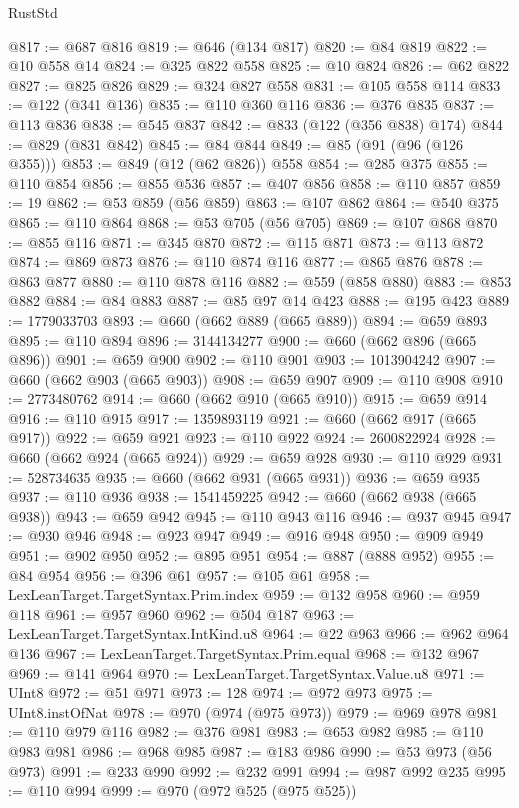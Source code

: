 \begin{lexlean}{RustStd}
\begin{coremodule}
@817 := @687 @816
@819 := @646 (@134 @817)
@820 := @84 @819
@822 := @10 @558 @14
@824 := @325 @822 @558
@825 := @10 @824
@826 := @62 @822
@827 := @825 @826
@829 := @324 @827 @558
@831 := @105 @558 @114
@833 := @122 (@341 @136)
@835 := @110 @360 @116
@836 := @376 @835
@837 := @113 @836
@838 := @545 @837
@842 := @833 (@122 (@356 @838) @174)
@844 := @829 (@831 @842)
@845 := @84 @844
@849 := @85 (@91 (@96 (@126 @355)))
@853 := @849 (@12 (@62 @826)) @558
@854 := @285 @375
@855 := @110 @854
@856 := @855 @536
@857 := @407 @856
@858 := @110 @857
@859 := 19
@862 := @53 @859 (@56 @859)
@863 := @107 @862
@864 := @540 @375
@865 := @110 @864
@868 := @53 @705 (@56 @705)
@869 := @107 @868
@870 := @855 @116
@871 := @345 @870
@872 := @115 @871
@873 := @113 @872
@874 := @869 @873
@876 := @110 @874 @116
@877 := @865 @876
@878 := @863 @877
@880 := @110 @878 @116
@882 := @559 (@858 @880)
@883 := @853 @882
@884 := @84 @883
@887 := @85 @97 @14 @423
@888 := @195 @423
@889 := 1779033703
@893 := @660 (@662 @889 (@665 @889))
@894 := @659 @893
@895 := @110 @894
@896 := 3144134277
@900 := @660 (@662 @896 (@665 @896))
@901 := @659 @900
@902 := @110 @901
@903 := 1013904242
@907 := @660 (@662 @903 (@665 @903))
@908 := @659 @907
@909 := @110 @908
@910 := 2773480762
@914 := @660 (@662 @910 (@665 @910))
@915 := @659 @914
@916 := @110 @915
@917 := 1359893119
@921 := @660 (@662 @917 (@665 @917))
@922 := @659 @921
@923 := @110 @922
@924 := 2600822924
@928 := @660 (@662 @924 (@665 @924))
@929 := @659 @928
@930 := @110 @929
@931 := 528734635
@935 := @660 (@662 @931 (@665 @931))
@936 := @659 @935
@937 := @110 @936
@938 := 1541459225
@942 := @660 (@662 @938 (@665 @938))
@943 := @659 @942
@945 := @110 @943 @116
@946 := @937 @945
@947 := @930 @946
@948 := @923 @947
@949 := @916 @948
@950 := @909 @949
@951 := @902 @950
@952 := @895 @951
@954 := @887 (@888 @952)
@955 := @84 @954
@956 := @396 @61
@957 := @105 @61
@958 := LexLeanTarget.TargetSyntax.Prim.index
@959 := @132 @958
@960 := @959 @118
@961 := @957 @960
@962 := @504 @187
@963 := LexLeanTarget.TargetSyntax.IntKind.u8
@964 := @22 @963
@966 := @962 @964 @136
@967 := LexLeanTarget.TargetSyntax.Prim.equal
@968 := @132 @967
@969 := @141 @964
@970 := LexLeanTarget.TargetSyntax.Value.u8
@971 := UInt8
@972 := @51 @971
@973 := 128
@974 := @972 @973
@975 := UInt8.instOfNat
@978 := @970 (@974 (@975 @973))
@979 := @969 @978
@981 := @110 @979 @116
@982 := @376 @981
@983 := @653 @982
@985 := @110 @983 @981
@986 := @968 @985
@987 := @183 @986
@990 := @53 @973 (@56 @973)
@991 := @233 @990
@992 := @232 @991
@994 := @987 @992 @235
@995 := @110 @994
@999 := @970 (@972 @525 (@975 @525))

\end{coremodule}
\end{lexlean}
